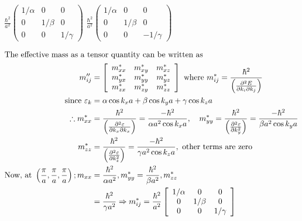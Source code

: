 \begin{enumerate}
\begin{tasks}
\task[\textbf{C.}] $\frac{\hbar^{2}}{a^{2}}\left(\begin{array}{ccc}1 / \alpha & 0 & 0 \\ 0 & 1 / \beta & 0 \\ 0 & 0 & 1 / \gamma\end{array}\right)$
\task[\textbf{D.}] $\frac{\hbar^{2}}{a^{2}}\left(\begin{array}{ccc}1 / \alpha & 0 & 0 \\ 0 & 1 / \beta & 0 \\ 0 & 0 & -1 / \gamma\end{array}\right)$
\end{tasks}
\begin{answer}
\begin{align*}
\intertext{The effective mass as a tensor quantity can be written as}
m_{i j}^{\prime \prime}&=\left[\begin{array}{ccc}m_{x x}^{*} & m_{x y}^{*} & m_{x z}^{*} \\ m_{y x}^{*} & m_{y y}^{*} & m_{y z}^{*} \\ m_{z x}^{*} & m_{z y}^{*} & m_{z z}^{*}\end{array}\right]\text{ where }m_{i j}^{*}=\frac{\hbar^{2}}{\left(\frac{\partial^{2} E}{\partial k_{i} \partial k_{j}}\right)}\\
\text{since }\varepsilon_{k}&=\alpha \cos k_{x} a+\beta \cos k_{y} a+\gamma \cos k_{z} a\\
\therefore m_{x x}^{*}&=\frac{\hbar^{2}}{\left(\frac{\partial^{2} \varepsilon}{\partial k_{x} \partial k_{x}}\right)}=\frac{-\hbar^{2}}{\alpha a^{2} \cos k_{x} a}, \quad m_{y y}^{*}=\frac{\hbar^{2}}{\left(\frac{\partial^{2} \varepsilon}{\partial k_{y}^{2}}\right)}=\frac{-\hbar^{2}}{\beta a^{2} \cos k_{y} a}\\
m_{z z}^{*}&=\frac{\hbar^{2}}{\left(\frac{\partial^{2} \varepsilon}{\partial k_{z}^{2}}\right)}=\frac{-\hbar^{2}}{\gamma a^{2} \cos k_{z} a}, \text{ other terms are zero}\\
\text{Now, at }\left(\frac{\pi}{a}, \frac{\pi}{a}, \frac{\pi}{a}\right) ; m_{x x}&=\frac{\hbar^{2}}{\alpha a^{2}}, m_{y y}^{*}=\frac{\hbar^{2}}{\beta a^{2}}, m_{z z}^{*}\\&=\frac{\hbar^{2}}{\gamma a^{2}} \Rightarrow m_{i j}^{*}=\frac{\hbar^{2}}{a^{2}}\left[\begin{array}{ccc}1 / \alpha & 0 & 0 \\ 0 & 1 / \beta & 0 \\ 0 & 0 & 1 / \gamma\end{array}\right]

\end{align*}
\end{answer}
\end{enumerate}
